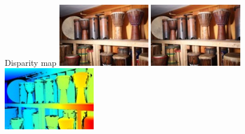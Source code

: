 \documentclass{beamer}
\begin{document}
\begin{frame}{Disparity map}
    \centering
    \includegraphics[width=0.3\textwidth]{images/im0.jpg}
    \includegraphics[width=0.3\textwidth]{images/im1.jpg}
    \includegraphics[width=0.3\textwidth]{images/disp0.jpg}
\end{frame}
\end{document}

